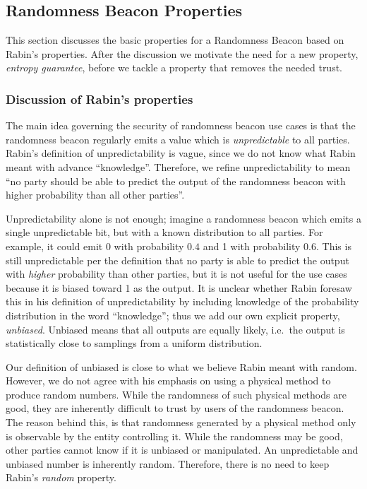 \subsection{Randomness Beacon Properties}
This section discusses the basic properties for a Randomness Beacon based on Rabin's properties.
After the discussion we motivate the need for a new property, \emph{entropy guarantee}, before we tackle a property that removes the needed trust.

\subsubsection{Discussion of Rabin's properties}
The main idea governing the security of randomness beacon use cases is that the randomness beacon regularly emits a value which is \emph{unpredictable} to all parties.
Rabin's definition of unpredictability is vague, since we do not know what Rabin meant with advance \enquote{knowledge}.
Therefore, we refine unpredictability to mean \enquote{no party should be able to predict the output of the randomness beacon with higher probability than all other parties}.

Unpredictability alone is not enough; imagine a randomness beacon which emits a single unpredictable bit, but with a known distribution to all parties.
For example, it could emit 0 with probability $0.4$ and 1 with probability $0.6$.
This is still unpredictable per the definition that no party is able to predict the output with \emph{higher} probability than other parties, but it is not useful for the use cases because it is biased toward 1 as the output.
It is unclear whether Rabin foresaw this in his definition of unpredictability by including knowledge of the probability distribution in the word \enquote{knowledge}; thus we add our own explicit property, \emph{unbiased}.
Unbiased means that all outputs are equally likely, i.e.\ the output is statistically close to samplings from a uniform distribution.

Our definition of unbiased is close to what we believe Rabin meant with random.
However, we do not agree with his emphasis on using a physical method to produce random numbers.
While the randomness of such physical methods are good, they are inherently difficult to trust by users of the randomness beacon.
The reason behind this, is that randomness generated by a physical method only is observable by the entity controlling it.
While the randomness may be good, other parties cannot know if it is unbiased or manipulated.
An unpredictable and unbiased number is inherently random.
Therefore, there is no need to keep Rabin's \emph{random} property.


